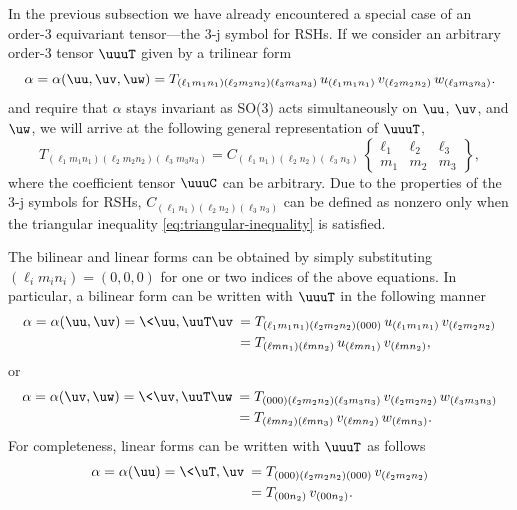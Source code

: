In the previous subsection we have already encountered a special case of an order-3 equivariant tensor---the 3-j symbol for RSHs.
If we consider an arbitrary order-3 tensor $\uuuT$ given by a trilinear form
\begin{equation}\label{eq:order-3-tensor-contraction}
    \alpha = \alpha(\uu,\uv,\uw) =
    T_{(\ell_1 m_1 n_1) (\ell_2 m_2 n_2) (\ell_3 m_3 n_3)} \,
    u_{(\ell_1 m_1 n_1)} \,
    v_{(\ell_2 m_2 n_2)} \,
    w_{(\ell_3 m_3 n_3)}.
\end{equation}
and require that $\alpha$ stays invariant as SO(3) acts simultaneously on $\uu$, $\uv$, and $\uw$, we will arrive at the following general representation of $\uuuT$,
\begin{equation}
    T_{(\ell_1 m_1 n_1) (\ell_2 m_2 n_2) (\ell_3 m_3 n_3)}
    = C_{(\ell_1 n_1) (\ell_2 n_2) (\ell_3 n_3)} \,
    \begin{Bmatrix}
        \ell_1 & \ell_2 & \ell_3 \\
        m_1 & m_2 & m_3
    \end{Bmatrix},
\end{equation}
where the coefficient tensor $\uuuC$ can be arbitrary.
Due to the properties of the 3-j symbols for RSHs, $C_{(\ell_1 n_1) (\ell_2 n_2) (\ell_3 n_3)}$ can be defined as nonzero only when the triangular inequality \eqref{eq:triangular-inequality} is satisfied.

The bilinear and linear forms can be obtained by simply substituting $(\ell_i m_i n_i) = (0,0,0)$ for one or two indices of the above equations.
In particular, a bilinear form can be written with $\uuuT$ in the following manner
\begin{equation}
\begin{aligned}
    \alpha = \alpha(\uu,\uv) = \< \uu, \uuT\uv \>
    &=
    T_{(\ell_1 m_1 n_1) (\ell_2 m_2 n_2) (0 0 0)} \,
    u_{(\ell_1 m_1 n_1)} \,
    v_{(\ell_2 m_2 n_2)} \\
    &=
    T_{(\ell m n_1) (\ell m n_2)} \,
    u_{(\ell m n_1)} \,
    v_{(\ell m n_2)}, \\
\end{aligned}
\end{equation}
or
\begin{equation}
\begin{aligned}
    \alpha = \alpha(\uv,\uw) = \< \uv, \uuT\uw \>
    &=
    T_{(0 0 0) (\ell_2 m_2 n_2) (\ell_3 m_3 n_3)} \,
    v_{(\ell_2 m_2 n_2)} \,
    w_{(\ell_3 m_3 n_3)} \\
    &=
    T_{(\ell m n_2) (\ell m n_3)} \,
    v_{(\ell m n_2)} \,
    w_{(\ell m n_3)}.
\end{aligned}
\end{equation}
For completeness, linear forms can be written with $\uuuT$ as follows
\begin{equation}
\begin{aligned}
    \alpha = \alpha(\uu) = \< \uT, \uv \>
    &=
    T_{(0 0 0) (\ell_2 m_2 n_2) (0 0 0)} \,
    v_{(\ell_2 m_2 n_2)} \\
    &=
    T_{(0 0 n_2)} \,
    v_{(0 0 n_2)}.
\end{aligned}
\end{equation}

